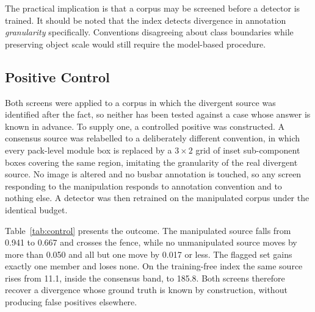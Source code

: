 The practical implication is that a corpus may be screened before a detector is
trained. It should be noted that the index detects divergence in annotation \emph{granularity}
specifically. Conventions disagreeing about class boundaries while preserving object
scale would still require the model-based procedure.

\subsection{Positive Control}
\label{sec:res-control}

\noindent Both screens were applied to a corpus in which the divergent source was
identified after the fact, so neither has been tested against a case whose answer is
known in advance. To supply one, a controlled positive was constructed. A consensus
source was relabelled to a deliberately different convention, in which every
pack-level module box is replaced by a $3\times2$ grid of inset sub-component boxes
covering the same region, imitating the granularity of the real divergent source. No
image is altered and no busbar annotation is touched, so any screen responding to the
manipulation responds to annotation convention and to nothing else. A detector was
then retrained on the manipulated corpus under the identical budget.

Table~\ref{tab:control} presents the outcome. The
manipulated source falls from 0.941 to 0.667 and crosses the fence, while no
unmanipulated source moves by more than 0.050 and all but one move by 0.017 or less. The
flagged set gains exactly one member and loses none. On the training-free index the
same source rises from 11.1, inside the consensus band, to 185.8. Both screens
therefore recover a divergence whose ground truth is known by construction, without
producing false positives elsewhere.

